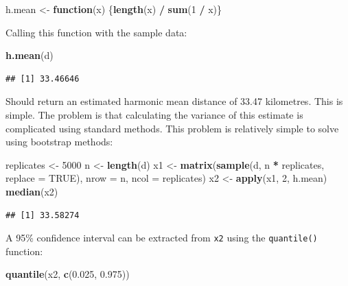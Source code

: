 \documentclass[12pt,a4paper]{book}
\newenvironment{Shaded}{\begin{snugshade}}{\end{snugshade}}
\newcommand{\KeywordTok}[1]{\textcolor[rgb]{0.13,0.29,0.53}{\textbf{#1}}}
\newcommand{\DataTypeTok}[1]{\textcolor[rgb]{0.13,0.29,0.53}{#1}}
\newcommand{\DecValTok}[1]{\textcolor[rgb]{0.00,0.00,0.81}{#1}}
\newcommand{\FloatTok}[1]{\textcolor[rgb]{0.00,0.00,0.81}{#1}}
\newcommand{\StringTok}[1]{\textcolor[rgb]{0.31,0.60,0.02}{#1}}
\newcommand{\OtherTok}[1]{\textcolor[rgb]{0.56,0.35,0.01}{#1}}
\newcommand{\ControlFlowTok}[1]{\textcolor[rgb]{0.13,0.29,0.53}{\textbf{#1}}}
\newcommand{\OperatorTok}[1]{\textcolor[rgb]{0.81,0.36,0.00}{\textbf{#1}}}
\newcommand{\NormalTok}[1]{#1}
\theoremstyle{definition}
\theoremstyle{definition}
\theoremstyle{definition}
\theoremstyle{remark}
\begin{document}
\begin{Shaded}
\begin{Highlighting}[]
\NormalTok{h.mean <-}\StringTok{ }\ControlFlowTok{function}\NormalTok{(x) \{}\KeywordTok{length}\NormalTok{(x) }\OperatorTok{/}\StringTok{ }\KeywordTok{sum}\NormalTok{(}\DecValTok{1} \OperatorTok{/}\StringTok{ }\NormalTok{x)\}}
\end{Highlighting}
\end{Shaded}

Calling this function with the sample data:

\begin{Shaded}
\begin{Highlighting}[]
\KeywordTok{h.mean}\NormalTok{(d)}
\end{Highlighting}
\end{Shaded}

\begin{verbatim}
## [1] 33.46646
\end{verbatim}

Should return an estimated harmonic mean distance of 33.47 kilometres.
This is simple. The problem is that calculating the variance of this
estimate is complicated using standard methods. This problem is
relatively simple to solve using bootstrap methods:

\begin{Shaded}
\begin{Highlighting}[]
\NormalTok{replicates <-}\StringTok{ }\DecValTok{5000}
\NormalTok{n <-}\StringTok{ }\KeywordTok{length}\NormalTok{(d)}
\NormalTok{x1 <-}\StringTok{ }\KeywordTok{matrix}\NormalTok{(}\KeywordTok{sample}\NormalTok{(d, n }\OperatorTok{*}\StringTok{ }\NormalTok{replicates, }\DataTypeTok{replace =} \OtherTok{TRUE}\NormalTok{),}
             \DataTypeTok{nrow =}\NormalTok{ n, }\DataTypeTok{ncol =}\NormalTok{ replicates)}
\NormalTok{x2 <-}\StringTok{ }\KeywordTok{apply}\NormalTok{(x1, }\DecValTok{2}\NormalTok{, h.mean)}
\KeywordTok{median}\NormalTok{(x2)}
\end{Highlighting}
\end{Shaded}

\begin{verbatim}
## [1] 33.58274
\end{verbatim}

A 95\% confidence interval can be extracted from \texttt{x2} using the
\texttt{quantile()} function:

\begin{Shaded}
\begin{Highlighting}[]
\KeywordTok{quantile}\NormalTok{(x2, }\KeywordTok{c}\NormalTok{(}\FloatTok{0.025}\NormalTok{, }\FloatTok{0.975}\NormalTok{))}
\end{Highlighting}
\end{Shaded}
\end{document}
